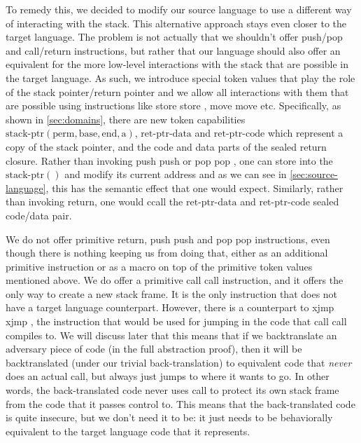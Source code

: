 \documentclass[a4paper]{article}
\newcommand{\sourcecolor}[1]{\color{blue}}
\newcommand{\src}[1]{{\sourcecolor{} #1}}
\newcommand{\targetcolor}[1]{\color{black}}
\newcommand{\trg}[1]{{\targetcolor{} #1}}
\newcommand{\zinstr}[1]{#1}
\newcommand{\oneinstr}[2]{
  \ifthenelse{\equal{#2}{}}
  {\zinstr{#1}}
  {\zinstr{#1} \; #2}
}
\newcommand{\twoinstr}[3]{
  \ifthenelse{\equal{#2#3}{}}
  {\zinstr{#1}}
  {\zinstr{#1} \; #2 \; #3}
}
\newcommand{\sreturn}{\zinstr{\src{return}}}
\newcommand{\spush}[1]{\oneinstr{\src{push}}{#1}}
\newcommand{\spop}[1]{\oneinstr{\src{pop}}{#1}}
\newcommand{\smove}[2]{\twoinstr{\src{move}}{#1}{#2}}
\newcommand{\sstore}[2]{\twoinstr{\src{store}}{#1}{#2}}
\newcommand{\scall}[2]{\twoinstr{\src{call}}{#1}{#2}}
\newcommand{\sxjmp}[2]{\twoinstr{\trg{xjmp}}{#1}{#2}}
\newcommand{\shareddom}[1]{\mathrm{#1}}
\newcommand{\permbnf}{\shareddom{perm}}
\newcommand{\addrbnf}{\shareddom{a}}
\newcommand{\basebnf}{\shareddom{base}}
\newcommand{\aendbnf}{\shareddom{end}}
\newcommand{\stkptr}[1]{\mathrm{stack\text{-}ptr}(#1)}
\newcommand{\retptrd}{\mathrm{ret\text{-}ptr\text{-}data}}
\newcommand{\retptrc}{\mathrm{ret\text{-}ptr\text{-}code}}
\begin{document}
To remedy this, we decided to modify our source language to use a different way of interacting with the stack.
This alternative approach stays even closer to the target language.
The problem is not actually that we shouldn't offer push/pop and call/return instructions, but rather that our language should also offer an equivalent for the more low-level interactions with the stack that are possible in the target language.
As such, we introduce special token values that play the role of the stack pointer/return pointer and we allow all interactions with them that are possible using instructions like \sstore{}{}, \smove{}{} etc.
Specifically, as shown in \cref{sec:domains}, there are new token capabilities $\stkptr{\permbnf,\basebnf,\aendbnf,\addrbnf}$, $\retptrd$ and $\retptrc$ which represent a copy of the stack pointer, and the code and data parts of the sealed return closure.
Rather than invoking \spush{} or \spop{}, one can store into the $\stkptr{}$ and modify its current address and as we can see in \cref{sec:source-language}, this has the semantic effect that one would expect.
Similarly, rather than invoking \sreturn{}, one would ccall the $\retptrd$ and $\retptrc$ sealed code/data pair.

We do not offer primitive \sreturn{}, \spush{} and \spop{} instructions, even though there is nothing keeping us from doing that, either as an additional primitive instruction or as a macro on top of the primitive token values mentioned above.
We do offer a primitive \scall{}{} instruction, and it offers the only way to create a new stack frame.
It is the only instruction that does not have a target language counterpart.
However, there is a counterpart to \sxjmp{}{}, the instruction that would be used for jumping in the code that \scall{}{} compiles to.
We will discuss later that this means that if we backtranslate an adversary piece of code (in the full abstraction proof), then it will be backtranslated (under our trivial back-translation) to equivalent code that \emph{never} does an actual call, but always just jumps to where it wants to go.
In other words, the back-translated code never uses call to protect its own stack frame from the code that it passes control to.
This means that the back-translated code is quite insecure, but we don't need it to be: it just needs to be behaviorally equivalent to the target language code that it represents.
\end{document}
